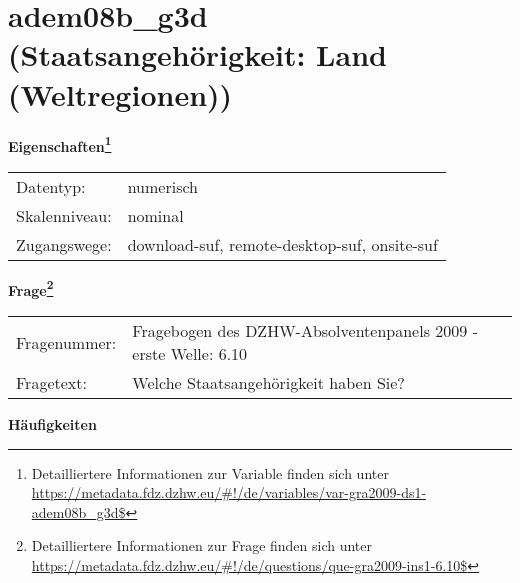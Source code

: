 
    \setcounter{footnote}{0}

    \vspace*{-1.8cm}
	\section{adem08b\_g3d (Staatsangehörigkeit: Land (Weltregionen))}
	\label{section:adem08b_g3d}



    \vspace*{0.5cm}
    \noindent\textbf{Eigenschaften\footnote{Detailliertere Informationen zur Variable finden sich unter
		\url{https://metadata.fdz.dzhw.eu/\#!/de/variables/var-gra2009-ds1-adem08b_g3d$}}}\\
	\begin{tabularx}{\hsize}{@{}lX}
	Datentyp: & numerisch \\
	Skalenniveau: & nominal \\
	Zugangswege: &
	  download-suf, 
	  remote-desktop-suf, 
	  onsite-suf
 \\
    \end{tabularx}



				\vspace*{0.5cm}
                \noindent\textbf{Frage\footnote{Detailliertere Informationen zur Frage finden sich unter
		              \url{https://metadata.fdz.dzhw.eu/\#!/de/questions/que-gra2009-ins1-6.10$}}}\\
				\begin{tabularx}{\hsize}{@{}lX}
					Fragenummer: &
					  Fragebogen des DZHW-Absolventenpanels 2009 - erste Welle:
					  6.10
 \\
					Fragetext: & Welche Staatsangehörigkeit haben Sie? \\
				\end{tabularx}





        		\vspace*{0.5cm}
                \noindent\textbf{Häufigkeiten}

